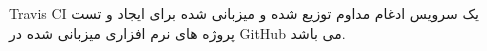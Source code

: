 Travis CI یک سرویس ادغام مداوم توزیع شده و میزبانی شده برای ایجاد و تست پروژه های نرم افزاری میزبانی شده در GitHub می باشد.

